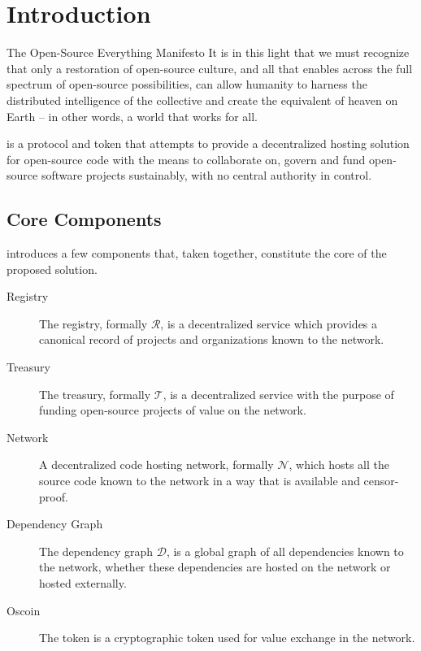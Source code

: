 \section{Introduction}

\begin{epigraph}{The Open-Source Everything Manifesto}
    It is in this light that we must recognize that only a restoration of
    open-source culture, and all that enables across the full spectrum of
    open-source possibilities, can allow humanity to harness the distributed
    intelligence of the collective and create the equivalent of heaven on Earth
    -- in other words, a world that works for all.
\end{epigraph}

\oscoin{} is a protocol and token that attempts to provide a decentralized
hosting solution for open-source code with the means to collaborate on, govern
and fund open-source software projects sustainably, with no central authority
in control.

\subsection{Core Components}

\oscoin{} introduces a few components that, taken together, constitute the core
of the proposed solution.

\begin{description}
    \item[Registry] The registry, formally $\mathcal{R}$, is a
        decentralized service which provides a canonical record of projects and
        organizations known to the network.
    \item[Treasury] The treasury, formally $\mathcal{T}$, is a
        decentralized service with the purpose of funding open-source projects
        of value on the network.
    \item[Network] A decentralized code hosting network, formally
        $\mathcal{N}$, which hosts all the source code known to the network
        in a way that is available and censor-proof.
    \item[Dependency Graph] The dependency graph $\mathcal{D}$, is a global
        graph of all dependencies known to the network, whether these
        dependencies are hosted on the network or hosted externally.
    \item[Oscoin] The \oscoin{} token is a cryptographic token used for value
        exchange in the network.
\end{description}

